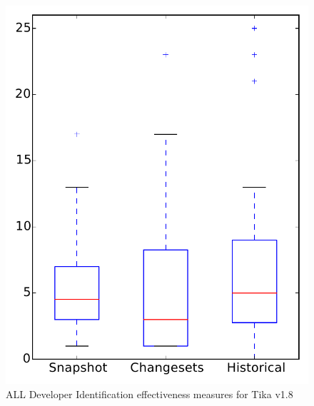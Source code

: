 
\begin{figure}
\centering
\includegraphics[height=0.4\textheight]{figures/dit/all_tika}
\caption{ALL Developer Identification effectiveness measures for Tika v1.8}
\label{fig:dit:all:tika}
\end{figure}
